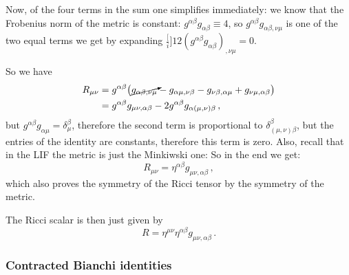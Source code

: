 \documentclass[main.tex]{subfiles}
\begin{document}
Now, of the four terms in the sum one simplifies immediately: we know that the Frobenius norm of the metric is constant: \(g^{\alpha \beta }g_{\alpha \beta } \equiv 4\), so \(g^{\alpha \beta }g_{\alpha \beta , \nu \mu }\) is one of the two equal terms we get by expanding \(\frac[i]{1}{2} (g^{\alpha \beta }g_{\alpha \beta })_{,\nu \mu } = 0\).

So we have 
%
\begin{subequations}
    \begin{align}
    R_{\mu \nu }
    &= g^{\alpha \beta }\qty(
        \cancelto{}{g_{\alpha \beta , \nu \mu }}
        - g_{\alpha \mu  , \nu \beta  }
        - g_{\nu  \beta , \alpha  \mu }
        + g_{\nu  \mu  , \alpha  \beta }      
        )  \\
    &= g^{\alpha \beta }g_{\mu \nu, \alpha \beta }
    - 2 g^{\alpha \beta } g_{\alpha (\mu, \nu) \beta }
\,,
\end{align}
\end{subequations}
%
but \(g^{\alpha \beta }g_{\alpha \mu } = \delta^{\beta }_{\mu }\), therefore the second term is proportional to \(\delta^{\beta }_{(\mu, \nu ) \beta }\), but the entries of the identity are constants, therefore this term is zero.
Also, recall that in the LIF the metric is just the Minkiwski one:
So in the end we get: 
%
\begin{equation}
  R_{\mu \nu } = \eta^{\alpha \beta }g_{\mu \nu, \alpha \beta   }
\,,
\end{equation}
%
which also proves the symmetry of the Ricci tensor by the symmetry of the metric.

The Ricci scalar is then just given by 
%
\begin{equation}
  R = \eta ^{\mu \nu }\eta ^{\alpha \beta }g_{\mu \nu , \alpha \beta }
\,.
\end{equation}

\subsubsection{Contracted Bianchi identities}
\end{document}
